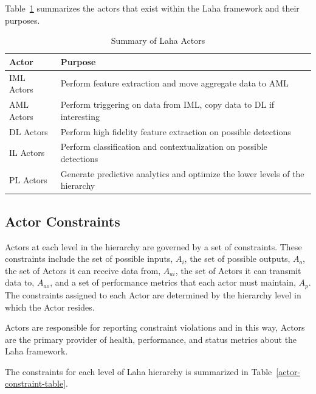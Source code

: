 Table~\ref{laha-actors-tables} summarizes the actors that exist within the Laha framework and their purposes.

\begin{table}[h]
	\centering
	\caption{Summary of Laha Actors}
	\begin{tabularx}{\textwidth}{lX}
		\toprule
		\textbf{Actor} & \textbf{Purpose} \\
		\midrule
		IML Actors & Perform feature extraction and move aggregate data to AML \\
		AML Actors & Perform triggering on data from IML, copy data to DL if interesting \\
		DL Actors & Perform high fidelity feature extraction on possible detections \\
		IL Actors & Perform classification and contextualization on possible detections \\
		PL Actors & Generate predictive analytics and optimize the lower levels of the hierarchy \\
		\bottomrule
	\end{tabularx}
	\label{laha-actors-tables}
\end{table}

\subsection{Actor Constraints}\label{subsec:actor-constraints}
Actors at each level in the hierarchy are governed by a set of constraints. These constraints include the set of possible inputs, $A_i$, the set of possible outputs, $A_o$, the set of Actors it can receive data from, $A_{ai}$, the set of Actors it can transmit data to, $A_{ao}$, and a set of performance metrics that each actor must maintain, $A_p$. The constraints assigned to each Actor are determined by the hierarchy level in which the Actor resides.

Actors are responsible for reporting constraint violations and in this way, Actors are the primary provider of health, performance, and status metrics about the Laha framework.

The constraints for each level of Laha hierarchy is summarized in Table~\ref{actor-constraint-table}.

